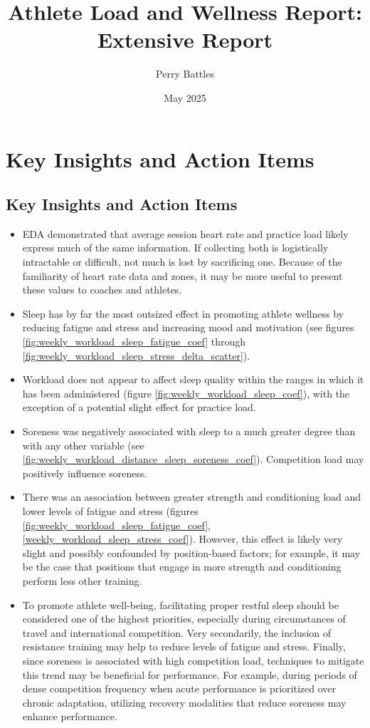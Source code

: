 \documentclass{article}
\title{Athlete Load and Wellness Report: Extensive Report}
\author{Perry Battles}
\date{May 2025}
\begin{document}
	\maketitle

	\section{Key Insights and Action Items}

		\subsection{Key Insights and Action Items}

			\begin{itemize}
				\item EDA demonstrated that average session heart rate and
				practice load likely express much of the same information.
				If collecting both is logistically intractable or difficult,
				not much is lost by sacrificing one. Because of the familiarity
				of heart rate data and zones, it may be more useful to present
				these values to coaches and athletes.
				\item Sleep has by far the most outsized effect in promoting
				athlete wellness by reducing fatigue and stress and increasing
				mood and motivation (see figures
				\ref{fig:weekly_workload_sleep_fatigue_coef} through
				\ref{fig:weekly_workload_sleep_stress_delta_scatter}).
				\item Workload does not appear to affect sleep quality within
				the ranges in which it has been administered (figure
				\ref{fig:weekly_workload_sleep_coef}), with the exception of a potential
				slight effect for practice load.
				\item Soreness was negatively associated with sleep to a much
				greater degree than with any other variable (see
				\ref{fig:weekly_workload_distance_sleep_soreness_coef}).
				Competition load may positively influence soreness.
				\item There was an association between greater
				strength and conditioning load and lower levels of fatigue
				and stress (figures \ref{fig:weekly_workload_sleep_fatigue_coef},
				\ref{weekly_workload_sleep_stress_coef}).
				However, this effect is likely very slight and possibly
				confounded by position-based factors; for example, it may be
				the case that positions that engage in more strength and
				conditioning perform less other training.
				\item To promote athlete well-being, facilitating proper
				restful sleep should be considered one of the highest priorities,
				especially during circumstances of travel and international
				competition. Very
				secondarily, the inclusion of resistance training may help to
				reduce levels of fatigue and stress. Finally, since soreness is
				associated with high competition load, techniques to mitigate
				this trend may be beneficial for performance. For example,
				during periods of dense competition frequency when acute
				performance is prioritized over chronic adaptation, utilizing
				recovery modalities that reduce soreness may enhance performance.
			\end{itemize}
\end{document}
